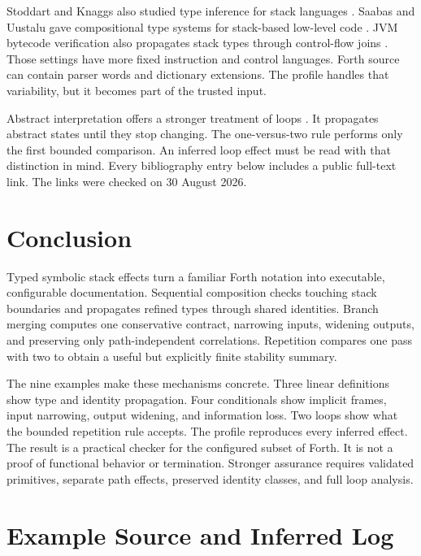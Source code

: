\documentclass[11pt,a4paper]{article}
\begin{document}
Stoddart and Knaggs also studied type inference for stack languages
\cite{stoddart1991}.  Saabas and Uustalu gave compositional type systems for
stack-based low-level code \cite{saabas2006}.  JVM bytecode verification also
propagates stack types through control-flow joins \cite{leroy2003}.  Those
settings have more fixed instruction and control languages.  Forth source can
contain parser words and dictionary extensions.  The profile handles that
variability, but it becomes part of the trusted input.

Abstract interpretation offers a stronger treatment of loops
\cite{cousot1977}.  It propagates abstract states until they stop changing.
The one-versus-two rule performs only the first bounded comparison.  An
inferred loop effect must be read with that distinction in mind.  Every
bibliography entry below includes a public full-text link.  The links were
checked on 30 August 2026.

\section{Conclusion}
\leavevmode\par\vspace{-\baselineskip}
Typed symbolic stack effects turn a familiar Forth notation into executable,
configurable documentation.  Sequential composition checks touching stack
boundaries and propagates refined types through shared identities.  Branch
merging computes one conservative contract, narrowing inputs, widening outputs,
and preserving only path-independent correlations.  Repetition compares one
pass with two to obtain a useful but explicitly finite stability summary.

The nine examples make these mechanisms concrete.  Three linear definitions
show type and identity propagation.  Four conditionals show implicit frames,
input narrowing, output widening, and information loss.  Two loops show what
the bounded repetition rule accepts.  The profile reproduces every inferred
effect.  The result is a practical checker for the configured subset of Forth.
It is not a proof of functional behavior or termination.  Stronger assurance
requires validated primitives, separate path effects, preserved identity
classes, and full loop analysis.

\appendix
\section{Example Source and Inferred Log}
\end{document}
